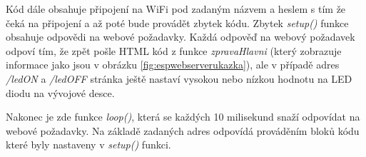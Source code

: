 Kód dále obsahuje připojení na WiFi pod zadaným názvem a heslem s tím že čeká na připojení a až poté bude provádět zbytek kódu. Zbytek \textit{setup()} funkce obsahuje odpovědi na webové požadavky. Každá odpověď na webový požadavek odpoví tím, že zpět pošle HTML kód z funkce \textit{zpravaHlavni} (který zobrazuje informace jako jsou v obrázku \ref{fig:espwebserverukazka}), ale v případě adres \textit{/ledON} a \textit{/ledOFF} stránka ještě nastaví vysokou nebo nízkou hodnotu na LED diodu na vývojové desce.

Nakonec je zde funkce \textit{loop()}, která se každých 10 milisekund snaží odpovídat na webové požadavky. Na základě zadaných adres odpovídá prováděním bloků kódu které byly nastaveny v \textit{setup()} funkci.


